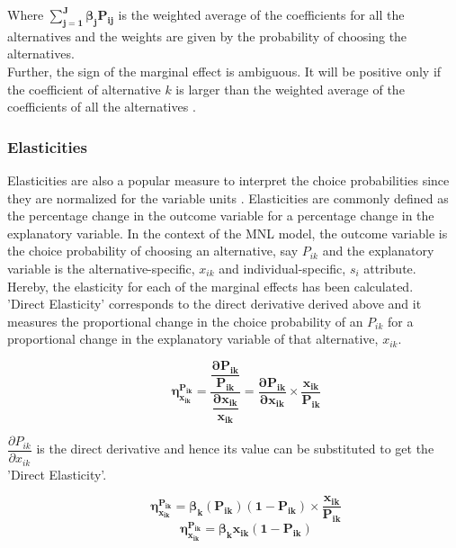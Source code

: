 \documentclass[a4paper,11pt]{article}
\begin{document}
    Where $\mathbf{\sum_{j = 1}^{J} \beta_{j}P_{ij}}$ is the weighted average of the coefficients for all the alternatives and the weights are given by the probability of choosing the alternatives.\\

    Further, the sign of the marginal effect is ambiguous. It will be positive only if the coefficient of alternative $k$ is larger than the weighted average of the coefficients of all the alternatives \cite{Croissant}.
        
\newpage
\subsubsection{Elasticities}
\label{subsubsec: Elasticities}    

    Elasticities are also a popular measure to interpret the choice probabilities since they are normalized for the variable units \cite{Train}. Elasticities are commonly defined as the percentage change in the outcome variable for a percentage change in the explanatory variable. In the context of the MNL model, the outcome variable is the choice probability of choosing an alternative, say $P_{ik}$ and the explanatory variable is the alternative-specific, $x_{ik}$ and individual-specific, $s_{i}$ attribute. Hereby, the elasticity for each of the marginal effects has been calculated.\\

    'Direct Elasticity' corresponds to the direct derivative derived above and it measures the proportional change in the choice probability of an $P_{ik}$ for a proportional change in the explanatory variable of that alternative, $x_{ik}$.

    \begin{equation*}
        \qquad \mathbf{\eta_{x_{ik}}^{P_{ik}} = \dfrac{\dfrac{\partial P_{ik}}{P_{ik}}}{\dfrac{\partial x_{ik}}{x_{ik}}} = \dfrac{\partial P_{ik}}{\partial x_{ik}} \times \dfrac{x_{ik}}{P_{ik}}}
    \end{equation*}

    $\dfrac{\partial P_{ik}}{\partial x_{ik}}$ is the direct derivative and hence its value can be substituted to get the 'Direct Elasticity'.

    \begin{equation*}
        \qquad \mathbf{\eta_{x_{ik}}^{P_{ik}} = \beta_{k}(P_{ik})(1 - P_{ik}) \times \dfrac{x_{ik}}{P_{ik}}}
    \end{equation*}
    \begin{equation*}
        \qquad \mathbf{\eta_{x_{ik}}^{P_{ik}} = \beta_{k}x_{ik}(1 - P_{ik})}
    \end{equation*}
\end{document}
